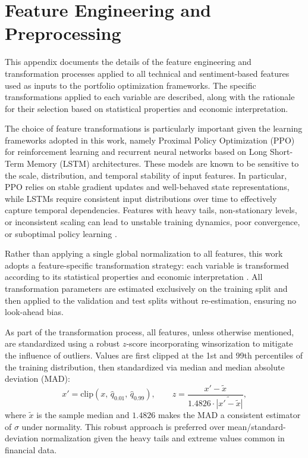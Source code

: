 \chapter{Feature Engineering and Preprocessing}
\label{chap:features_transformations}


\begin{introduction}
This appendix documents the details of the feature engineering and transformation processes applied to all technical and sentiment-based features used as inputs to the portfolio optimization frameworks. The specific transformations applied to each variable are described, along with the rationale for their selection based on statistical properties and economic interpretation.
\end{introduction}


The choice of feature transformations is particularly important given the learning frameworks adopted in this work, namely Proximal Policy Optimization (PPO) for reinforcement learning and recurrent neural networks based on Long Short-Term Memory (LSTM) architectures. These models are known to be sensitive to the scale, distribution, and temporal stability of input features. In particular, PPO relies on stable gradient updates and well-behaved state representations, while LSTMs require consistent input distributions over time to effectively capture temporal dependencies. Features with heavy tails, non-stationary levels, or inconsistent scaling can lead to unstable training dynamics, poor convergence, or suboptimal policy learning \cite{8944624, engstrom2020implementationmattersdeeppolicy}.

Rather than applying a single global normalization to all features, this work adopts a feature-specific transformation strategy: each variable is transformed according to its statistical properties and economic interpretation \cite{tran2021bilinearinputnormalizationneural, e23111546, cucuringu2025forecastingintradayvolumeequity}. All transformation parameters are estimated exclusively on the training split and then applied to the validation and test splits without re-estimation, ensuring no look-ahead bias.

As part of the transformation process, all features, unless otherwise mentioned, are standardized using a robust $z$-score incorporating winsorization to mitigate the influence of outliers. Values are first clipped at the 1st and 99th percentiles of the training distribution, then standardized via median and median absolute deviation (MAD):
\[
    x' = \text{clip}(x,\,\hat{q}_{0.01},\,\hat{q}_{0.99}), \qquad
    z = \frac{x' - \widetilde{x}}{1.4826\cdot\widetilde{|x' - \widetilde{x}|}},
\]
where $\widetilde{x}$ is the sample median and $1.4826$ makes the MAD a consistent estimator of $\sigma$ under normality. This robust approach is preferred over mean/standard-deviation normalization given the heavy tails and extreme values common in financial data.


